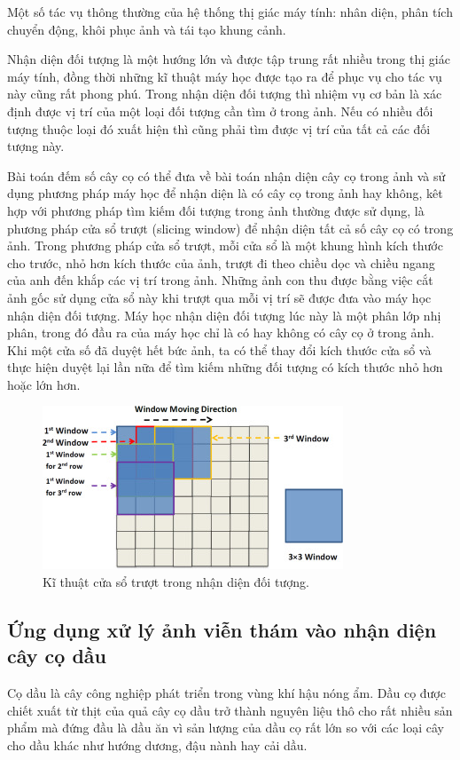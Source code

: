 \documentclass[14pt, oneside, a4paper, openany]{scrartcl}
\begin{document}
Một số tác vụ thông thường của hệ thống thị giác máy tính: nhân diện, phân tích chuyển động, khôi phục ảnh và tái tạo khung cảnh.

Nhận diện đối tượng là một hướng lớn và được tập trung rất nhiều trong thị giác máy tính, đồng thời những kĩ thuật máy học được tạo ra để phục vụ cho tác vụ này cũng rất phong phú. Trong nhận diện đối tượng thì nhiệm vụ cơ bản là xác định được vị trí của một loại đối tượng cần tìm ở trong ảnh. Nếu có nhiều đối tượng thuộc loại đó xuất hiện thì cũng phải tìm được vị trí của tất cả các đối tượng này.

Bài toán đếm số cây cọ có thể đưa về bài toán nhận diện cây cọ trong ảnh và sử dụng phương pháp máy học để nhận diện là có cây cọ trong ảnh hay không, kêt hợp với phương pháp tìm kiếm đối tượng trong ảnh thường được sử dụng, là phương pháp cửa sổ trượt  (slicing window) để nhận diện tất cả số cây cọ có trong ảnh. 
Trong phương pháp cửa sổ trượt, mỗi cửa sổ là một khung hình kích thước cho trước, nhỏ hơn kích thước của ảnh, trượt đi theo chiều dọc và chiều ngang của anh đến khắp các vị trí trong ảnh. Những ảnh con thu được bằng việc cắt ảnh gốc sử dụng cửa sổ này khi trượt qua mỗi vị trí sẽ được đưa vào máy học nhận diện đối tượng. Máy học nhận diện đối tượng lúc này là một phân lớp nhị phân, trong đó đầu ra của máy học chỉ là có hay không có cây cọ ở trong ảnh. Khi một cửa số đã duyệt hết bức ảnh, ta có thể thay đổi kích thước cửa sổ và thực hiện duyệt lại lần nữa để tìm kiếm những đối tượng có kích thước nhỏ hơn hoặc lớn hơn.

\begin{figure}
	\centering
	\includegraphics[scale=1]{figures/slicingWindow.jpg} 
	\caption[Kĩ thuật cửa sổ trượt]{Kĩ thuật cửa sổ trượt trong nhận diện đối tượng.}
\end{figure}


\subsection{Ứng dụng xử lý ảnh viễn thám vào nhận diện cây cọ dầu}
Cọ dầu là cây công nghiệp phát triển trong vùng khí hậu nóng ẩm. Dầu cọ được chiết xuất từ thịt của quả cây cọ dầu trở thành nguyên liệu thô cho rất nhiều sản phẩm mà đứng đầu là dầu ăn vì sản lượng của dầu cọ rất lớn so với các loại cây cho dầu khác như hướng dương, đậu nành hay cải dầu. 
\end{document}
